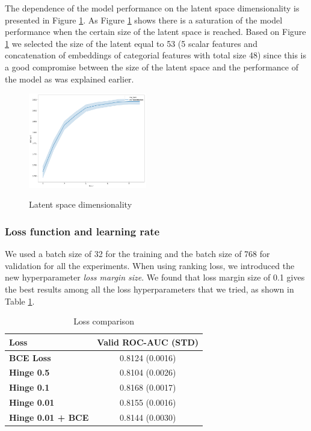 \documentclass[sigconf]{acmart}
\begin{document}
The dependence of the model performance on the latent space dimensionality is presented in Figure \ref{fig-lat}. As Figure \ref{fig-lat} shows there is a saturation of the model performance when the certain size of the latent space is reached. Based on Figure \ref{tab-loss} we selected the size of the latent equal to 53 (5 scalar features and concatenation of embeddings of categorial features with total size 48) since this is a good compromise between the size of the latent space and the performance of the model as was explained earlier.

\begin{figure}[ht]
  \caption{Latent space dimensionality}
  \includegraphics[width=0.46\textwidth]{latent-pic.png}
  \label{fig-lat}
\end{figure}

\subsubsection{Loss function and learning rate}

We used a batch size of 32 for the training and the batch size of 768 for validation for all the experiments. When using ranking loss, we introduced the new hyperparameter \textit{loss margin size}. We found that loss margin size of 0.1 gives the best results among all the loss hyperparameters that we tried, as shown in Table \ref{tab-loss}. 

\begin{table}[ht]
\caption{Loss comparison}
\begin{tabular}{ | l | c |  }
\hline
\textbf{Loss} & \textbf{Valid ROC-AUC (STD)} \\
\hline
\textbf{BCE Loss} & 0.8124 (0.0016)  \\
\textbf{Hinge 0.5} & 0.8104 (0.0026)  \\
\textbf{Hinge 0.1} & 0.8168 (0.0017)  \\
\textbf{Hinge 0.01} & 0.8155 (0.0016)  \\
\textbf{Hinge 0.01 + BCE} & 0.8144 (0.0030)  \\
\hline
\end{tabular}
\label{tab-loss}
\end{table}
\end{document}
